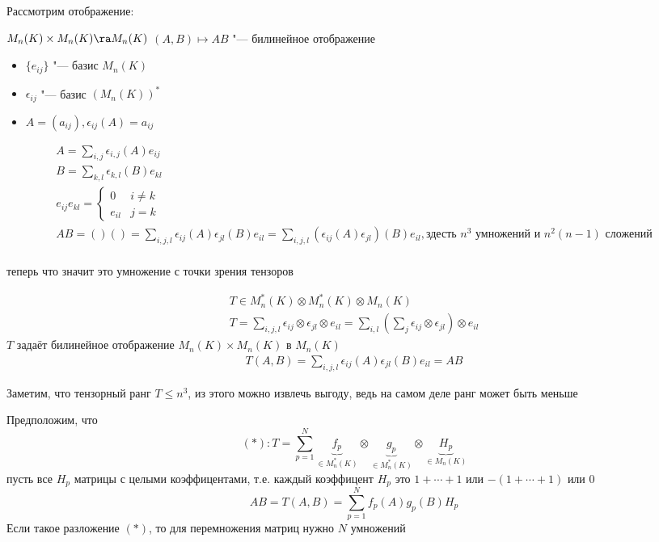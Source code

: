 Рассмотрим отображение:

$ M_n(K) \times M_n(K) \ra M_n(K)$
$ (A, B) \mapsto AB$ "--- билинейное отображение

\begin{itemize}
    \item $\{e_{ij}\}$ "--- базис $M_n(K)$
    \item $\epsilon_{ij}$ "--- базис $(M_n(K))^*$
    \item $A = (a_{ij}), \epsilon_{ij}(A) = a_{ij}$
\end{itemize}

\begin{gather*}
    A = \sum_{i,j} \epsilon_{i,j}(A)e_{ij} \\
    B = \sum_{k,l} \epsilon_{k,l}(B)e_{kl} \\
    e_{ij}e_{kl} = \left\{
    \begin{matrix} 
    0 & i \neq k \\
    e_{il} & j = k
    \end{matrix}
    \right. \\
    AB = ()() = \sum_{i,j,l} \epsilon_{ij}(A)\epsilon_{jl}(B)e_{il} = 
    \sum_{i,j,l} \left(\epsilon_{ij}(A) \epsilon_{jl}\right)(B)e_{il}, 
    \text{здесть $n^3$ умножений и $n^2(n-1)$ сложений} \\
\end{gather*}

теперь что значит это умножение с точки зрения тензоров

\begin{gather*}
    T \in M^*_n(K) \otimes M^*_n(K) \otimes M_n(K) \\
    T = \sum_{i,j,l} \epsilon_{ij} \otimes \epsilon_{jl} \otimes e_{il} = 
        \sum_{i,l} (\sum_{j} \epsilon_{ij} \otimes \epsilon_{jl}) \otimes e_{il}
\end{gather*}
$T$ задаёт билинейное отображение $M_n(K)\times M_n(K)$ в $M_n(K)$
\begin{gather*}
    T(A, B) = \sum_{i,j,l} \epsilon_{ij}(A) \epsilon_{jl}(B) e_{il} = AB
\end{gather*}

Заметим, что тензорный ранг $T \leq n^3$, из этого можно извлечь выгоду, ведь на самом деле
ранг может быть меньше

Предположим, что 
$$(*): T = \sum^N_{p=1}    \underbrace{f_p}_{\in M_n^*(K)} \otimes 
                    \underbrace{g_p}_{\in M_n^*(K)} \otimes
                    \underbrace{H_p}_{\in M_n(K)} $$
пусть все $H_p$ матрицы с целыми коэффицентами, т.е. каждый коэффицент $H_p$ это $1 + \cdots + 1$ или $-(1 + \cdots + 1)$ или $0$
$$ AB = T(A, B) = \sum_{p=1}^N f_p(A)g_p(B)H_p $$
Если такое разложение $(*)$, то для перемножения матриц нужно $N$ умножений


